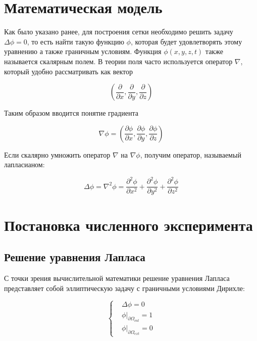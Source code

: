 \documentclass[a4paper,12pt]{article}
\begin{document}
\section{Математическая модель}

Как было указано ранее, для построения сетки необходимо решить задачу $\Delta \phi = 0$, то есть найти такую функцию $\phi$, которая будет удовлетворять этому уравнению а также граничным условиям. Функция $\phi (x, y, z, t)$ также называется скалярным полем. В теории поля часто используется оператор $\nabla$, который удобно рассматривать как вектор

\begin{equation*}
    \left( \frac{\partial}{\partial x}, \frac{\partial}{\partial y}, \frac{\partial}{\partial z} \right)
\end{equation*}

Таким образом вводится понятие градиента

\begin{equation*}
    \nabla \phi = \left( \frac{\partial \phi}{\partial x}, \frac{\partial \phi}{\partial y}, \frac{\partial \phi}{\partial z} \right)
\end{equation*}

Если скалярно умножить оператор $\nabla$ на $\nabla \phi$, получим оператор, называемый лапласианом:

\begin{equation*}
    \Delta \phi = \nabla^2 \phi = \frac{\partial^2 \phi}{\partial x^2} + \frac{\partial^2 \phi}{\partial y^2} + \frac{\partial^2 \phi}{\partial z^2}
\end{equation*}

\section{Постановка численного эксперимента}

\subsection{Решение уравнения Лапласа}

С точки зрения вычислительной математики решение уравнения Лапласа представляет собой эллиптическую задачу с граничными условиями Дирихле:

\begin{equation}
    \left\{
        \begin{aligned}
            & \Delta \phi = 0 \\
            & \phi|_{\partial \Omega_{int}} = 1 \\
            & \phi|_{\partial \Omega_{ext}} = 0
        \end{aligned}
    \right.
\end{equation}
\end{document}
